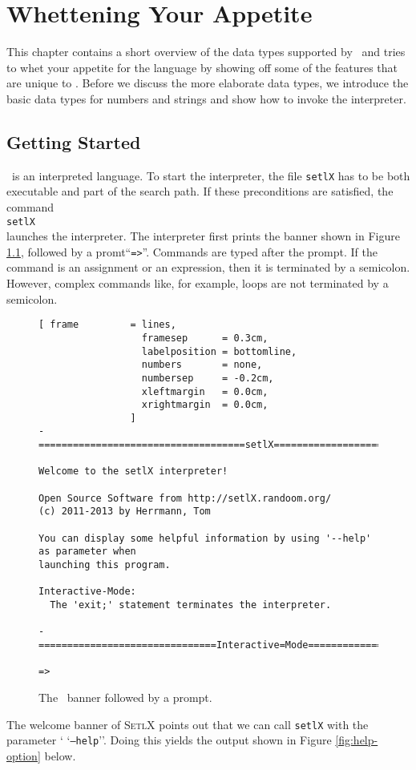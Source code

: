 \chapter{Whettening Your Appetite}
This chapter contains a short overview of the data types supported by
\setlx\ and tries to whet your appetite for the language by showing off some of
the features that are unique to \setlx.  Before we discuss the more elaborate data types,
we introduce the basic data types for numbers and strings and show how to invoke the interpreter.


\section{Getting Started}
\setlx\ is an interpreted language.  To start the interpreter,  the file
\texttt{setlX} has to be both executable and part of the search path.   If these
preconditions are satisfied, the command
\\[0.2cm]
\hspace*{1.3cm}
\texttt{setlX}
\\[0.2cm]
 launches the interpreter.  The interpreter first prints the banner shown in Figure
\ref{fig:banner}, followed by a promt``\texttt{=>}''.  Commands are typed after the prompt.    
If the command is an assignment or an expression, then it is terminated by a semicolon.
However, complex commands like, for example, loops are not terminated by a semicolon.

\begin{figure}[!ht]
\centering
\begin{Verbatim}[ frame         = lines, 
                  framesep      = 0.3cm, 
                  labelposition = bottomline,
                  numbers       = none,
                  numbersep     = -0.2cm,
                  xleftmargin   = 0.0cm,
                  xrightmargin  = 0.0cm,
                ]
-====================================setlX=============================v1.6.0=-

Welcome to the setlX interpreter!

Open Source Software from http://setlX.randoom.org/
(c) 2011-2013 by Herrmann, Tom

You can display some helpful information by using '--help' as parameter when
launching this program.

Interactive-Mode:
  The 'exit;' statement terminates the interpreter.

-===============================Interactive=Mode==============================-

=> 
\end{Verbatim}
\vspace*{-0.3cm}
\caption{The \setlx\ banner followed by a prompt.}
\label{fig:banner}
\end{figure}
\noindent
The welcome banner of \textsc{SetlX} points out that we can call \texttt{setlX} with the parameter `
`\texttt{--help}''.   Doing this yields the output shown in Figure \ref{fig:help-option} below. 

